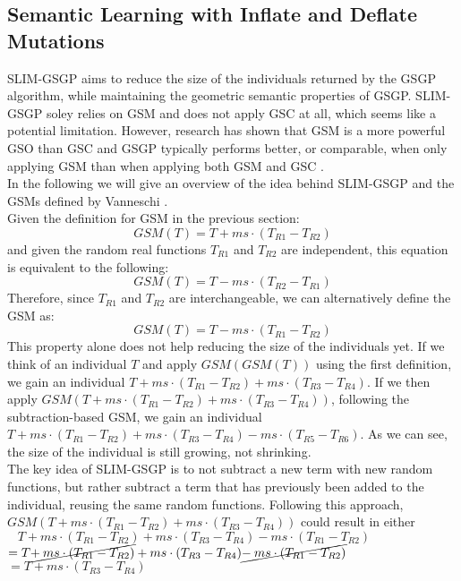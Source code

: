 \documentclass[manuscript, review, anonymous]{acmart} %
\begin{document}
\subsection{Semantic Learning with Inﬂate and Deﬂate Mutations}
\label{sec:slimgsgp}
SLIM-GSGP aims to reduce the size of the individuals returned
by the GSGP algorithm,
while maintaining the geometric semantic properties of GSGP.
SLIM-GSGP soley relies on GSM and does not apply GSC at
all, which seems like a potential limitation. However, research has
shown that
GSM is a more powerful GSO than GSC and GSGP
typically performs better, or comparable, when only applying GSM
than when applying both GSM and GSC \cite{Castelli2016, Vanneschi2014}.\\
In the following we will give an overview of the idea behind SLIM-GSGP and the GSMs defined by Vanneschi \cite{Vanneschi2024}.\\
Given the definition for GSM in the previous section:
\[
GSM(T) = T + ms \cdot (T_{R1} - T_{R2})
\]
and given the random real functions \( T_{R1} \) and
\( T_{R2} \) are independent, this equation is equivalent to
the following:
\[
GSM(T) = T - ms \cdot (T_{R2} - T_{R1})
\]
Therefore, since $T_{R1}$ and $T_{R2}$ are interchangeable, we can alternatively
define the GSM as:
\[
GSM(T) = T - ms \cdot (T_{R1} - T_{R2})
\]
This property alone does not help reducing the size of
the individuals yet.
If we think of an individual $T$ and apply $GSM(GSM(T))$
using the first definition, we gain an individual
$T + ms \cdot (T_{R1} - T_{R2}) + ms \cdot
(T_{R3} - T_{R4})$.
If we then apply
$GSM(T + ms \cdot (T_{R1} - T_{R2}) + ms \cdot
(T_{R3} - T_{R4}))$,
following the subtraction-based GSM, we gain an individual
$T + ms \cdot (T_{R1} - T_{R2}) + ms \cdot
(T_{R3} - T_{R4}) - ms \cdot (T_{R5} - T_{R6})$.
As we can see, the size of the individual is still growing, not shrinking.\\
The key idea of SLIM-GSGP is to not subtract a
new term with new random functions, but rather subtract a
term that has previously been added to the individual, reusing
the same random functions.
Following this approach,
$GSM(T + ms \cdot (T_{R1} - T_{R2}) + ms \cdot
(T_{R3} - T_{R4}))$
could result in either\\
$\;\;\;T + ms \cdot (T_{R1} - T_{R2}) + ms \cdot (T_{R3} - T_{R4}) - ms \cdot (T_{R1} - T_{R2})$\\
$= T  \cancel{+\: ms \cdot (T_{R1} - T_{R2})} + ms \cdot (T_{R3} - T_{R4}) \cancel{-\: ms \cdot (T_{R1} - T_{R2})}$\\
$= T + ms \cdot (T_{R3} - T_{R4})$\\
\end{document}
